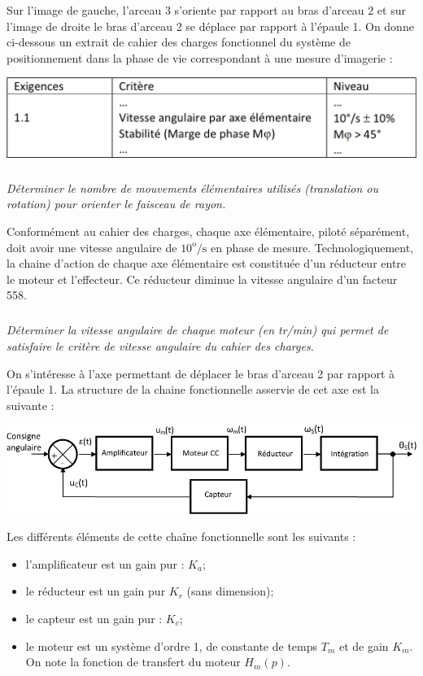 \documentclass[10pt,fleqn]{article} %
\begin{document}
\begin{multicols}{2}
Sur l’image de gauche, l’arceau 3 s’oriente par rapport au bras d’arceau 2 et sur l’image de droite le bras d’arceau 2 se déplace par rapport à l’épaule 1. On donne ci-dessous un extrait de cahier des charges fonctionnel du système de positionnement dans la phase de vie correspondant à une mesure d'imagerie : 

\begin{center}
\includegraphics[width=\linewidth]{images/fig_07}
\end{center}


\subparagraph{}\textit{Déterminer le nombre de mouvements élémentaires utilisés (translation ou rotation) pour orienter le faisceau de rayon. }

Conformément au cahier des charges, chaque axe élémentaire, piloté séparément, doit avoir une vitesse angulaire de $10^{\text{o}}\text{/s}$ en phase de mesure. Technologiquement, la chaine d’action de chaque axe élémentaire est constituée d’un réducteur entre le moteur et l’effecteur. Ce réducteur diminue la vitesse angulaire d'un facteur 558. 

\subparagraph{}\textit{Déterminer la vitesse angulaire de chaque moteur (en tr/min) qui permet de satisfaire le critère de vitesse angulaire du cahier des charges. }

On s’intéresse à l’axe permettant de déplacer le bras d’arceau 2 par rapport à l’épaule 1. La structure de la chaine fonctionnelle asservie de cet axe est la suivante : 
\begin{center}
\includegraphics[width=\linewidth]{images/fig_04}
\end{center}


Les différents éléments de cette chaîne fonctionnelle sont les suivants :
\begin{itemize}
\item l'amplificateur est un gain pur : $K_a$;
\item le réducteur est un gain pur $K_r$ (sans dimension);
\item le capteur est un gain pur : $K_c$;
\item le moteur est un système d'ordre 1, de constante de temps $T_m$ et de gain $K_m$. On note la fonction de transfert du moteur $H_m (p)$. 
\end{itemize}


\end{multicols}
\end{document}
